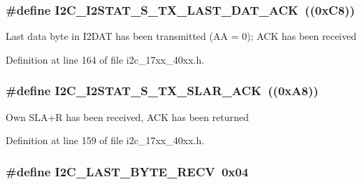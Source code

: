 \subsubsection[{\texorpdfstring{I2\+C\+\_\+\+I2\+S\+T\+A\+T\+\_\+\+S\+\_\+\+T\+X\+\_\+\+L\+A\+S\+T\+\_\+\+D\+A\+T\+\_\+\+A\+CK}{I2C_I2STAT_S_TX_LAST_DAT_ACK}}]{\setlength{\rightskip}{0pt plus 5cm}\#define I2\+C\+\_\+\+I2\+S\+T\+A\+T\+\_\+\+S\+\_\+\+T\+X\+\_\+\+L\+A\+S\+T\+\_\+\+D\+A\+T\+\_\+\+A\+CK~((0x\+C8))}\hypertarget{group__I2C__17XX__40XX_ga3e4522387958da1da6017a6e48a0daad}{}\label{group__I2C__17XX__40XX_ga3e4522387958da1da6017a6e48a0daad}
Last data byte in I2\+D\+AT has been transmitted (AA = 0); A\+CK has been received 

Definition at line 164 of file i2c\+\_\+17xx\+\_\+40xx.\+h.

\subsubsection[{\texorpdfstring{I2\+C\+\_\+\+I2\+S\+T\+A\+T\+\_\+\+S\+\_\+\+T\+X\+\_\+\+S\+L\+A\+R\+\_\+\+A\+CK}{I2C_I2STAT_S_TX_SLAR_ACK}}]{\setlength{\rightskip}{0pt plus 5cm}\#define I2\+C\+\_\+\+I2\+S\+T\+A\+T\+\_\+\+S\+\_\+\+T\+X\+\_\+\+S\+L\+A\+R\+\_\+\+A\+CK~((0x\+A8))}\hypertarget{group__I2C__17XX__40XX_gae6dcbdd1f01f7ebf3595722770e3b7b6}{}\label{group__I2C__17XX__40XX_gae6dcbdd1f01f7ebf3595722770e3b7b6}
Own S\+L\+A+R has been received, A\+CK has been returned 

Definition at line 159 of file i2c\+\_\+17xx\+\_\+40xx.\+h.

\subsubsection[{\texorpdfstring{I2\+C\+\_\+\+L\+A\+S\+T\+\_\+\+B\+Y\+T\+E\+\_\+\+R\+E\+CV}{I2C_LAST_BYTE_RECV}}]{\setlength{\rightskip}{0pt plus 5cm}\#define I2\+C\+\_\+\+L\+A\+S\+T\+\_\+\+B\+Y\+T\+E\+\_\+\+R\+E\+CV~0x04}\hypertarget{group__I2C__17XX__40XX_gadbb787dfeda35fe21147da81f68c0b57}{}\label{group__I2C__17XX__40XX_gadbb787dfeda35fe21147da81f68c0b57}


